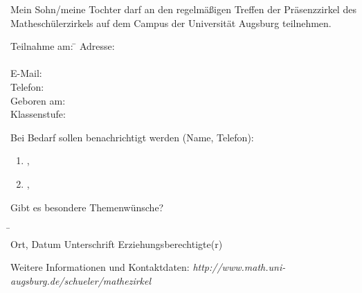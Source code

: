 \documentclass{mamazettel}
\begin{document}
\renewcommand{\betreff}{Anmeldung zum Matheschülerzirkel der Universität Augsburg}

\makeletterhead

Mein Sohn/meine Tochter \freistLang{} darf an den regelmäßigen Treffen der
Präsenzzirkel des Matheschülerzirkels auf dem Campus der Universität Augsburg
teilnehmen.

\vspace{-0.5em}
\doublespacing
\begin{tabbing}
  Teilnahme am: \= \kill
  Adresse: \> \freistLang \\
  \> \freistLang \\
  E-Mail: \> \freistLang \\
  Telefon: \> \freistLang \\
  Geboren am: \> \freistLang \\
  Klassenstufe: \> \freistKurz
\end{tabbing}

Bei Bedarf sollen benachrichtigt werden (Name, Telefon):
\begin{enumerate}
\item \freist{7cm},\quad\freist{7cm}
\item \freist{7cm},\quad\freist{7cm}
\end{enumerate}

\vspace{1em}
Gibt es besondere Themenwünsche?
\freist{10cm}

\vfill

\begin{tabbing}
  \freistMittel \qquad\qquad \= \kill
  \freistMittel \> \freistLaenger \\
  Ort, Datum \> Unterschrift Erziehungsberechtigte(r)
\end{tabbing}

\scriptsize
Weitere Informationen und Kontaktdaten:
\textsl{http:/\!/www.math.uni-augsburg.de/schueler/mathezirkel}
\end{document}

